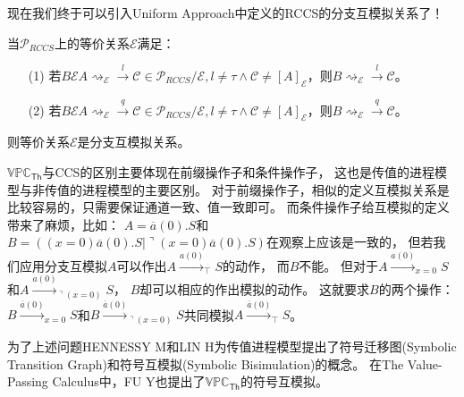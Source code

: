    现在我们终于可以引入Uniform Approach中定义的RCCS的分支互模拟关系了！

   \begin{definition}[分支互模拟]
      当$\mathcal{P}_{RCCS}$上的等价关系$\mathcal{E}$满足：
      \begin{itemize}
         \item[(1)] {
            若$B\mathcal{E}A\rightsquigarrow_{\mathcal{E}}\stackrel{l}{\rightarrow}\mathcal{C}\in \mathcal{P}_{RCCS}/\mathcal{E}, l\neq \tau \wedge \mathcal{C}\neq [A]_{\mathcal{E}}$，则$B\rightsquigarrow_{\mathcal{E}}\stackrel{l}{\rightarrow}\mathcal{C}$。
         }
         \item[(2)] {
            若$B\mathcal{E}A\rightsquigarrow_{\mathcal{E}}\stackrel{q}{\rightarrow}\mathcal{C}\in \mathcal{P}_{RCCS}/\mathcal{E}, l\neq \tau \wedge \mathcal{C}\neq [A]_{\mathcal{E}}$，则$B\rightsquigarrow_{\mathcal{E}}\stackrel{q}{\rightarrow}\mathcal{C}$。
         }
      \end{itemize}
      则等价关系$\mathcal{E}$是分支互模拟关系。
   \end{definition}

   $\mathbb{VPC}_{\mathsf{Th}}$与CCS的区别主要体现在前缀操作子和条件操作子，
   这也是传值的进程模型与非传值的进程模型的主要区别。
   对于前缀操作子，相似的定义互模拟关系是比较容易的，只需要保证通道一致、值一致即可。
   而条件操作子给互模拟的定义带来了麻烦，比如：
   $A=\overline{a}(0).S$和$B=((x=0) \overline{a}(0).S|\urcorner (x=0) \overline{a}(0).S)$在观察上应该是一致的，
   但若我们应用分支互模拟$A$可以作出$A\stackrel{a(0)}{\rightarrow}_{\top}S$的动作，
   而$B$不能。
   但对于$A\stackrel{a(0)}{\rightarrow}_{x=0}S$和$A\stackrel{a(0)}{\rightarrow}_{\urcorner (x=0)}S$，
   $B$却可以相应的作出模拟的动作。
   这就要求$B$的两个操作：$B\stackrel{\overline{a}(0)}{\longrightarrow}_{x=0} S$和$B\stackrel{\overline{a}(0)}{\longrightarrow}_{\urcorner (x=0)} S$共同模拟$A\stackrel{\overline{a}(0)}{\longrightarrow}_{\top} S$。

   为了上述问题HENNESSY M和LIN H为传值进程模型提出了符号迁移图(Symbolic Transition Graph)和符号互模拟(Symbolic Bisimulation)的概念\cite{Symbolic_bisimulation}。
   在The Value-Passing Calculus中，FU Y也提出了$\mathbb{VPC}_\mathsf{Th}$的符号互模拟\cite{Fu_VPC}。
   
